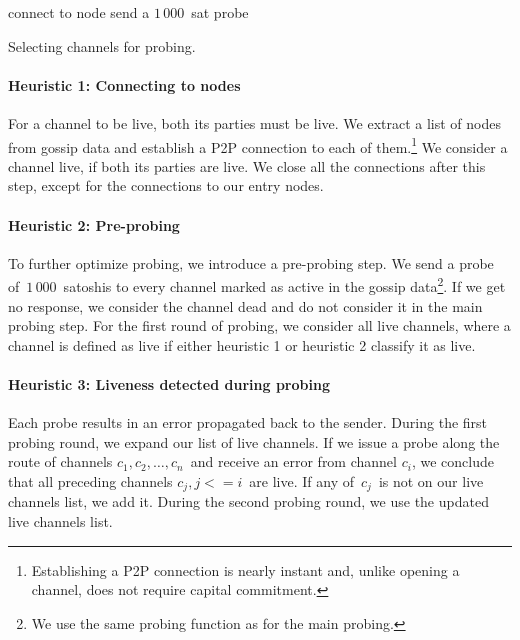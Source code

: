 \begin{algorithm}
	 {
		connect to node\;
	}
	 {
		send a $1\,000$~sat probe\;
	}
	\caption{Selecting channels for probing.}
	\label{alg:select-channels}
\end{algorithm}

\paragraph{Heuristic 1: Connecting to nodes}
For a channel to be live, both its parties must be live.
We extract a list of nodes from gossip data and establish a P2P connection to each of them.\footnote{Establishing a P2P connection is nearly instant and, unlike opening a channel, does not require capital commitment.}
We consider a channel live, if both its parties are live.
We close all the connections after this step, except for the connections to our entry nodes.

\paragraph{Heuristic 2: Pre-probing}
To further optimize probing, we introduce a pre-probing step.
We send a probe of~$1\,000$~satoshis to every channel marked as active in the gossip data\footnote{We use the same probing function as for the main probing.}.
If we get no response, we consider the channel dead and do not consider it in the main probing step.
For the first round of probing, we consider all live channels, where a channel is defined as live if either heuristic 1 or heuristic 2 classify it as live.

\paragraph{Heuristic 3: Liveness detected during probing}
Each probe results in an error propagated back to the sender.
During the first probing round, we expand our list of live channels.
If we issue a probe along the route of channels $c_1, c_2, \dots, c_n$~and receive an error from channel $c_i$, we conclude that all preceding channels $c_j, j<=i$~are live.
If any of~$c_j$~is not on our live channels list, we add it.
During the second probing round, we use the updated live channels list.


